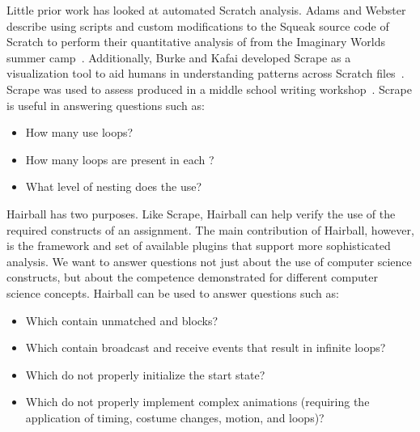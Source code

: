 Little prior work has looked at automated Scratch analysis.  Adams and Webster
describe using scripts and custom modifications to the Squeak source code of
Scratch to perform their quantitative analysis of  from the
Imaginary Worlds summer camp~\cite{Adams:2012:SLP:2157136.2157319}.
Additionally, Burke and Kafai developed Scrape as a visualization tool to aid
humans in understanding patterns across Scratch
files~\cite{scrape-poster}. Scrape was used to assess  produced in
a middle school writing workshop~\cite{Burke:2012:WWY:2157136.2157264}. Scrape
is useful in answering questions such as:
\begin{itemize}
\vspace*{-.025in}
\item How many  use loops?
\vspace*{-.025in}
\item How  many loops are present in each \sprogram{}?
\vspace*{-.025in}
\item What level of nesting does the \sprogram{} use?
\vspace*{-.025in}
\end{itemize}

Hairball has two purposes.  Like Scrape, Hairball can help verify the use of
the required constructs of an assignment.  The main contribution of Hairball,
however, is the framework and set of available plugins that support more
sophisticated analysis.  We want to answer questions not just about the use of
computer science constructs, but about the competence demonstrated for
different computer science concepts. Hairball can be used to answer questions
such as:
\begin{itemize}
\vspace*{-.025in}
\item Which  contain unmatched \broadcast{} and \receive{} blocks?
\vspace*{-.025in}
\item Which  contain broadcast and receive events that result in
  infinite loops?
\vspace*{-.025in}
\item Which  do not properly initialize the start state?
\vspace*{-.025in}
\item Which  do not properly implement complex animations
  (requiring the application of timing, costume changes, motion, and loops)?
\vspace*{-.025in}
\end{itemize}
\vspace*{0.25in}
